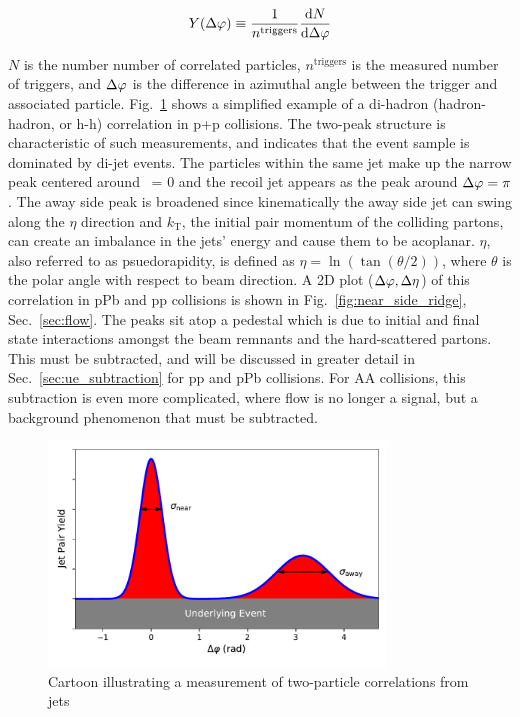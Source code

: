 \begin{equation}
    Y(\Delta\varphi)\equiv \frac{1}{n^\mathrm{triggers}}\frac{\mathrm{d}N}{\mathrm{d}\Delta\varphi}
    \label{eq:yield}
  \end{equation}

$N$ is the number number of correlated particles, $n^\mathrm{triggers}$ is the measured number of triggers, and  $\Delta\varphi$ is the difference in azimuthal angle between the trigger and associated particle. Fig.~\ref{fig:dihadron_cartoon} shows a simplified example of a di-hadron (hadron-hadron, or h-h) correlation in p+p collisions. The two-peak structure is characteristic of such measurements, and indicates that the event sample is dominated by di-jet events. The particles within the same jet make up the narrow peak centered around \deltaphi~= 0 and the recoil jet appears as the peak around $\Delta\varphi = \pi$. The away side peak is broadened since kinematically the away side jet can swing along the $\eta$ direction and $k_\mathrm{T}$, the initial pair momentum of the colliding partons, can create an imbalance in the jets’ energy and cause them to be acoplanar. $\eta$, also referred to as psuedorapidity, is defined as $\eta = \ln(\tan(\theta/2))$, where $\theta$ is the polar angle with respect to beam direction. A 2D plot ($\Delta\varphi,\Delta\eta$) of this correlation in pPb and pp collisions is shown in Fig.~\ref{fig:near_side_ridge}, Sec.~\ref{sec:flow}. The peaks sit atop a pedestal which is due to initial and final state interactions amongst the beam remnants and the hard-scattered partons. This must be subtracted, and will be discussed in greater detail in Sec.~\ref{sec:ue_subtraction} for pp and pPb collisions. For AA collisions, this subtraction is even more complicated, where flow is no longer a signal, but a background phenomenon that must be subtracted. 

  \begin{figure}[htpb]
    \centering
    \includegraphics[width=0.8\textwidth]{Introduction/dihadron_cartoon.pdf}
    \caption{Cartoon illustrating a measurement of two-particle correlations from jets}
    \label{fig:dihadron_cartoon}
  \end{figure}

